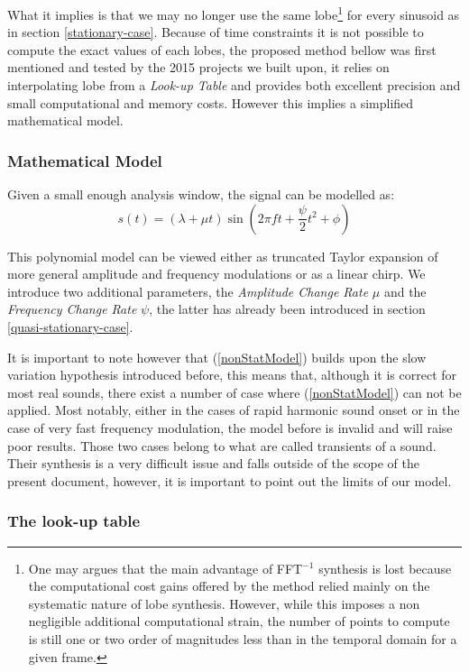 \documentclass[]{article}
\begin{document}
What it implies is that we may no longer use the same lobe\footnote{One may argues that the main advantage of FFT$^{-1}$ synthesis is lost because the computational cost gains offered by the method relied mainly on the systematic nature of lobe synthesis. However, while this imposes a non negligible additional computational strain, the number of points to compute is still one or two order of magnitudes less than in the temporal domain for a given frame.} for every sinusoid as in section \ref{stationary-case}. Because of time constraints it is not possible to compute the exact values of each lobes, the proposed method bellow was first mentioned and tested by the 2015 projects we built upon, it relies on interpolating lobe from a \emph{Look-up Table} and provides both excellent precision and small computational and memory costs. However this implies a simplified mathematical model.
\subsubsection{Mathematical Model}\label{mathematical model}
 Given a small enough analysis window, the signal can be modelled \cite{analysis-general} as:
\begin{equation}\label{nonStatModel}
s(t) = (\lambda + \mu t)\sin\left(2\pi f t + \frac{\psi}2 t^2  + \phi\right)
\end{equation}

This polynomial model can be viewed either as truncated Taylor expansion of more general amplitude and frequency modulations or as a linear chirp. We introduce two additional parameters, the \emph{Amplitude Change Rate} $\mu$ and the \emph{Frequency Change Rate}  $\psi$, the latter has already been introduced in section \ref{quasi-stationary-case}.

It is important to note however that (\ref{nonStatModel}) builds upon the slow variation hypothesis introduced before, this means that, although it is correct for most real sounds, there exist a number of case where (\ref{nonStatModel}) can not be applied. Most notably, either in the cases of rapid harmonic sound onset or in the case of very fast frequency modulation, the model before is invalid and will raise poor results. Those two cases belong to what are called transients of a sound. Their synthesis is a very difficult issue and falls outside of the scope of the present document, however, it is important to point out the limits of our model.
\subsubsection{The look-up table}\label{the look-up table}
\end{document}
